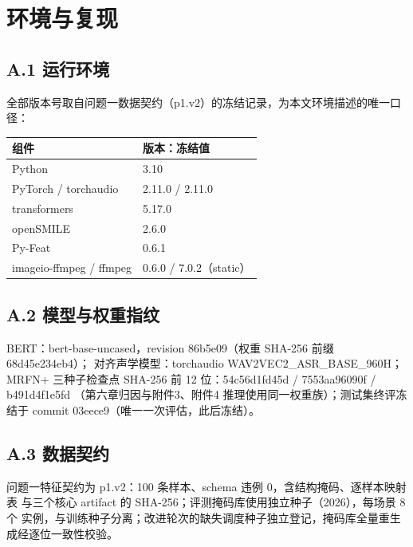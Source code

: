 \documentclass[colorprint,nocoverzero]{gmcmthesis}
\begin{document}
\clearpage

\nocite{openai2026gpt56,zhipuai2026glm53,minimax2026minimax3}


\appendix
\setcounter{figure}{0}\setcounter{table}{0}
\makeatletter
\renewcommand{\thefigure}{\Alph{section}.\arabic{figure}}
\renewcommand{\thetable}{\Alph{section}.\arabic{table}}
\makeatother

\clearpage
\section{环境与复现}
\subsection*{A.1 运行环境}
全部版本号取自问题一数据契约（p1.v2）的冻结记录，为本文环境描述的唯一口径：
\begin{center}\small
\begin{tabular}{ll}
  \toprule
  组件 & 版本：冻结值 \\
  \midrule
  Python & 3.10 \\
  PyTorch / torchaudio & 2.11.0 / 2.11.0 \\
  transformers & 5.17.0 \\
  openSMILE & 2.6.0 \\
  Py-Feat & 0.6.1 \\
  imageio-ffmpeg / ffmpeg & 0.6.0 / 7.0.2（static） \\
  \bottomrule
\end{tabular}
\end{center}

\subsection*{A.2 模型与权重指纹}
BERT：bert-base-uncased，revision 86b5e09（权重 SHA-256 前缀 68d45e234eb4）；
对齐声学模型：torchaudio WAV2VEC2\_ASR\_BASE\_960H；
MRFN+ 三种子检查点 SHA-256 前 12 位：54c56d1fd45d / 7553aa96090f / b491d4f1e5fd
（第六章归因与附件3、附件4 推理使用同一权重族）；测试集终评冻结于 commit
03eece9（唯一一次评估，此后冻结）。

\subsection*{A.3 数据契约}
问题一特征契约为 p1.v2：100 条样本、schema 违例 0，含结构掩码、逐样本映射表
与三个核心 artifact 的 SHA-256；评测掩码库使用独立种子（2026），每场景 8 个
实例，与训练种子分离；改进轮次的缺失调度种子独立登记，掩码库全量重生成经逐位一致性校验。
\end{document}
